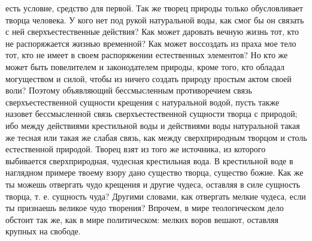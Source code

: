 \documentclass[12pt]{article}
\begin{document}
есть условие, средство для первой. Так же творец природы только обусловливает творца человека. У кого нет под рукой натуральной воды, как смог бы он связать с ней сверхъестественные действия? Как может даровать вечную жизнь тот, кто не распоряжается жизнью временной? Как может воссоздать из праха мое тело тот, кто не имеет в своем распоряжении естественных элементов? Но кто же может быть повелителем и законодателем природы, кроме того, кто обладал могуществом и силой, чтобы из ничего создать природу простым актом своей воли? Поэтому объявляющий бессмысленным противоречием связь сверхъестественной сущности крещения с натуральной водой, пусть также назовет бессмысленной связь сверхъестественной сущности творца с природой; ибо между действиями крестильной воды и действиями воды натуральной такая же тесная или такая же слабая связь, как между сверхприродным творцом и столь естественной природой. Творец взят из того же источника, из которого выбивается сверхприродная, чудесная крестильная вода. В крестильной воде в наглядном примере твоему взору дано существо творца, существо божие. Как же ты можешь отвергать чудо крещения и другие чудеса, оставляя в силе сущность творца, т. е. сущность чуда? Другими словами, как отвергать мелкие чудеса, если ты признаешь великое чудо творения? Впрочем, в мире теологическом дело обстоит так же, как в мире политическом: мелких воров вешают, оставляя крупных на свободе.



\section{}
\end{document}
